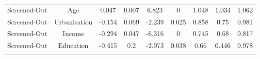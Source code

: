 \begin{table}[!htbp]
\begin{tabular}{@{\extracolsep{5pt}} ccccccccc}
Screened-Out & Age & 0.047 & 0.007 & 6.823 & 0 & 1.048 & 1.034 & 1.062 \\ 
Screened-Out & Urbanisation & -0.154 & 0.069 & -2.239 & 0.025 & 0.858 & 0.75 & 0.981 \\ 
Screened-Out & Income & -0.294 & 0.047 & -6.316 & 0 & 0.745 & 0.68 & 0.817 \\ 
Screened-Out & Education & -0.415 & 0.2 & -2.073 & 0.038 & 0.66 & 0.446 & 0.978 \\ 
\hline \\[-1.8ex] 
\end{tabular} 
\end{table} 
